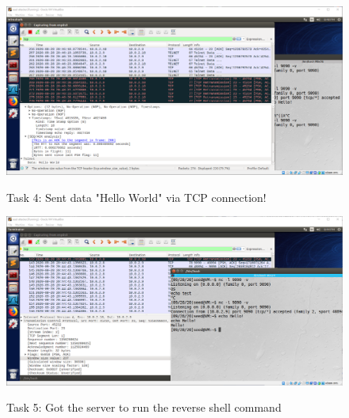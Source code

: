 \documentclass[a4paper]{article}
\begin{document}
\begin{figure}[h]
    \caption{Task 4: Sent data "Hello World" via TCP connection!}
    \includegraphics[width=\textwidth]{task4_2.png}
    \label{task4}
\end{figure}
\begin{figure}[h]
    \caption{Task 5: Got the server to run the reverse shell command}
    \includegraphics[width=\textwidth]{task5_2.png}
    \label{task5}
\end{figure}
\end{document}
